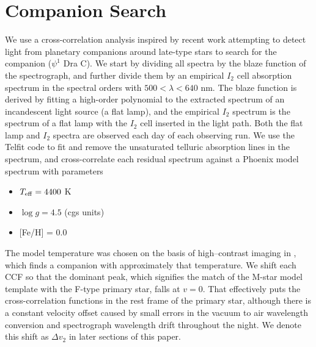 \documentclass[twocolumn]{emulateapj}
\begin{document}
 
 
 


\section{Companion Search}
\label{sec:method}

We use a cross-correlation analysis inspired by recent work attempting to detect light from planetary companions around late-type stars \citep{Gullikson2013, Martins2013} to search for the companion ($\psi^1$ Dra C). We start by dividing all spectra by the blaze function of the spectrograph, and further divide them by an empirical $I_2$ cell absorption spectrum in the spectral orders with $500 < \lambda < 640$ nm. The blaze function is derived by fitting a high-order polynomial to the extracted spectrum of an incandescent light source (a flat lamp), and the empirical $I_2$ spectrum is the spectrum of a flat lamp with the $I_2$ cell inserted in the light path. Both the flat lamp and $I_2$ spectra are observed each day of each observing run. We use the Telfit code \citep{Gullikson2014} to fit and remove the unsaturated telluric absorption lines in the spectrum, and cross-correlate each residual spectrum against a Phoenix model spectrum \citep{Husser2013} with parameters

\begin{itemize}
\item $T_{\rm eff} = 4400$ K
\item $\log{g} = 4.5$ (cgs units)
\item {[}Fe/H{]} = 0.0
\end{itemize}

The model temperature was chosen on the basis of high--contrast imaging in \citet{Endl2015}, which finds a companion with approximately that temperature. We shift each CCF so that the dominant peak, which signifies the match of the M-star model template with the F-type primary star, falls at $v=0$. That effectively puts the cross-correlation functions in the rest frame of the primary star, although there is a constant velocity offset caused by small errors in the vacuum to air wavelength conversion and spectrograph wavelength drift throughout the night. We denote this shift as $\Delta v_2$ in later sections of this paper.
\end{document}
